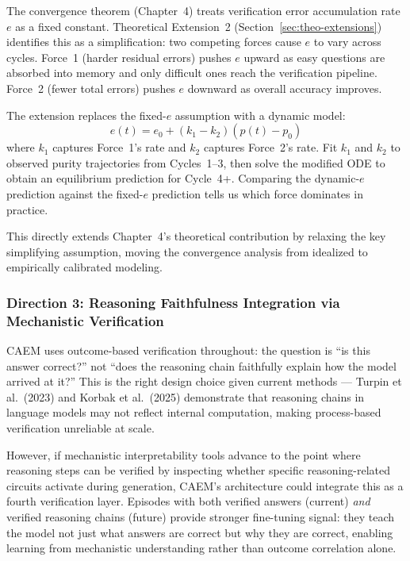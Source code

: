 \documentclass[12pt,a4paper]{article}
\theoremstyle{definition}
\begin{document}
The convergence theorem (Chapter~4) treats verification error accumulation rate $e$ as a fixed constant. Theoretical Extension~2 (Section~\ref{sec:theo-extensions}) identifies this as a simplification: two competing forces cause $e$ to vary across cycles. Force~1 (harder residual errors) pushes $e$ upward as easy questions are absorbed into memory and only difficult ones reach the verification pipeline. Force~2 (fewer total errors) pushes $e$ downward as overall accuracy improves.

The extension replaces the fixed-$e$ assumption with a dynamic model:
\[
e(t) = e_0 + (k_1 - k_2)(p(t) - p_0)
\]
where $k_1$ captures Force~1's rate and $k_2$ captures Force~2's rate. Fit $k_1$ and $k_2$ to observed purity trajectories from Cycles~1--3, then solve the modified ODE to obtain an equilibrium prediction for Cycle~4+. Comparing the dynamic-$e$ prediction against the fixed-$e$ prediction tells us which force dominates in practice.

This directly extends Chapter~4's theoretical contribution by relaxing the key simplifying assumption, moving the convergence analysis from idealized to empirically calibrated modeling.

\subsubsection{Direction 3: Reasoning Faithfulness Integration via Mechanistic Verification}

CAEM uses outcome-based verification throughout: the question is ``is this answer correct?'' not ``does the reasoning chain faithfully explain how the model arrived at it?'' This is the right design choice given current methods --- Turpin et al.\ (2023) and Korbak et al.\ (2025) demonstrate that reasoning chains in language models may not reflect internal computation, making process-based verification unreliable at scale.

However, if mechanistic interpretability tools advance to the point where reasoning steps can be verified by inspecting whether specific reasoning-related circuits activate during generation, CAEM's architecture could integrate this as a fourth verification layer. Episodes with both verified answers (current) \textit{and} verified reasoning chains (future) provide stronger fine-tuning signal: they teach the model not just what answers are correct but why they are correct, enabling learning from mechanistic understanding rather than outcome correlation alone.
\end{document}
